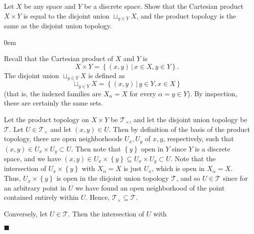 \documentclass[12pt]{article}
\renewcommand{\qed}{\hfill$\blacksquare$}
\renewenvironment{proof}{\begin{addmargin}[1em]{0em}\begin{newproof}}{\end{newproof}\end{addmargin}\qed}
\newenvironment{exercise}[2][Exercise]{\begin{trivlist}
\item[\hskip \labelsep {\bfseries #1}\hskip \labelsep {\bfseries #2.}]}{\end{trivlist}}
\begin{document}
\begin{exercise}{3.45}
Let $X$ be any space and $Y$ be a discrete space. Show that the Cartesian product $X\times Y$ is equal to the disjoint union $\sqcup_{y\in Y} X$, and the product topology is the same as the disjoint union topology.
\end{exercise}
\begin{proof}
Recall that the Cartesian product of $X$ and $Y$ is $$X\times Y = \left\{ \left(x,y\right) \, | \, x\in X, y\in Y\right\}.$$ The disjoint union $\sqcup_{y\in Y} X$ is defined as $$ \sqcup_{y\in Y} X  = \left\{ \left(x,y\right) \, | \, y\in Y, x\in X\right\} $$ (that is, the indexed families are $X_{\alpha} = X$ for every $\alpha = y \in Y$). By inspection, these are certainly the same sets.

Let the product topology on $X\times Y$ be $\mathcal{T}_{\times}$, and let the disjoint union topology be $\mathcal{T}$. Let $U \in \mathcal{T}_{\times}$ and let $\left(x,y\right) \in U$. Then by definition of the basis of the product topology, there are open neighborhoods $U_x, U_y$ of $x,y$, respectively, such that $\left(x,y\right) \in U_x \times U_y \subset U$. Then note that $\left\{y\right\}$ open in $Y$ since $Y$ is a discrete space, and we have $
\left(x,y\right) \in U_x \times \left\{y\right\} \subseteq U_x \times U_y \subset U$. Note that the intersection of $U_x \times \left\{y\right\}$ with $X_{\alpha}=X$ is just $U_x$, which is open in $X_{\alpha}=X$. Thus, $U_x \times \left\{y\right\}$ is open in the disjoint union topology $\mathcal{T}$, and so $U \in \mathcal{T}$ since for an arbitrary point in $U$ we have found an open neighborhood of the point contained entirely within $U$. Hence, $\mathcal{T}_{\times} \subseteq \mathcal{T}$.

Conversely, let $U \in \mathcal{T}$. Then the intersection of $U$ with
\end{proof}
\end{document}
